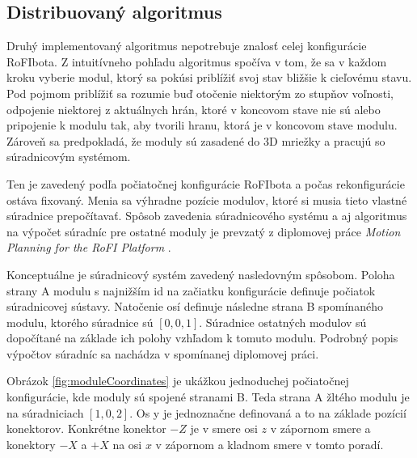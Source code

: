 \documentclass[
  digital, %
  oneside, %
  table,   %
  lof,     %
  nolot,     %
]{fithesis3}
\begin{document}
\subsection{Distribuovaný algoritmus}
\label{sec:distributedAlgo}
Druhý implementovaný algoritmus nepotrebuje znalosť celej konfigurácie RoFIbota. Z intuitívneho pohľadu algoritmus spočíva v tom, že sa v každom kroku vyberie modul, ktorý sa pokúsi priblížiť svoj stav bližšie k cieľovému stavu. Pod pojmom priblížiť sa rozumie buď otočenie niektorým zo stupňov voľnosti, odpojenie niektorej z aktuálnych hrán, ktoré v koncovom stave nie sú alebo pripojenie k modulu tak, aby tvorili hranu, ktorá je v koncovom stave modulu. Zároveň sa predpokladá, že moduly sú zasadené do 3D mriežky a pracujú so súradnicovým systémom.

Ten je zavedený podľa počiatočnej konfigurácie RoFIbota a počas rekonfigurácie ostáva fixovaný. Menia sa výhradne pozície modulov, ktoré si musia tieto vlastné súradnice prepočítavať. Spôsob zavedenia súradnicového systému a aj algoritmus na výpočet súradníc pre ostatné moduly je prevzatý z diplomovej práce \textit{Motion Planning for the RoFI Platform} \cite{vozarovaMasterThesis}. 

Konceptuálne je súradnicový systém zavedený nasledovným spôsobom. Poloha strany A modulu s najnižším id na začiatku konfigurácie definuje počiatok súradnicovej sústavy. Natočenie osí definuje následne strana B spomínaného modulu, ktorého súradnice sú $[0, 0, 1]$. Súradnice ostatných modulov sú dopočítané na základe ich polohy vzhľadom k tomuto modulu. Podrobný popis výpočtov súradníc sa nachádza v spomínanej diplomovej práci.  

Obrázok \ref{fig:moduleCoordinates} je ukážkou jednoduchej počiatočnej konfigurácie, kde moduly sú spojené stranami B. Teda strana A žltého modulu je na súradniciach $[1, 0, 2]$. Os y je jednoznačne definovaná a to na základe pozícií konektorov. Konkrétne konektor $-Z$ je v smere osi $z$ v zápornom smere a konektory $-X$ a $+X$ na osi $x$ v zápornom a kladnom smere v tomto poradí. 
\end{document}
